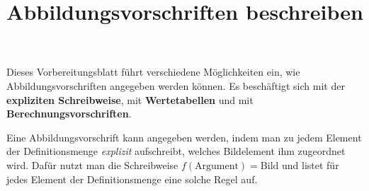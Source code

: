 \documentclass[]{uebungsblatt}
\title{Abbildungsvorschriften beschreiben}
\begin{document}
\maketitle
\begin{contents}
    Dieses Vorbereitungsblatt führt verschiedene Möglichkeiten ein, wie Abbildungsvorschriften angegeben werden können. Es beschäftigt sich mit der \textbf{expliziten Schreibweise}, mit \textbf{Wertetabellen} und mit \textbf{Berechnungsvorschriften}.
\end{contents}


\begin{remark}
    Eine Abbildungsvorschrift kann angegeben werden, indem man zu jedem Element der Definitionsmenge \emph{explizit} aufschreibt, welches Bildelement ihm zugeordnet wird. Dafür nutzt man die Schreibweise $f(\text{Argument})=\text{Bild}$ und listet für jedes Element der Definitionsmenge eine solche Regel auf.
\end{remark}
\end{document}
